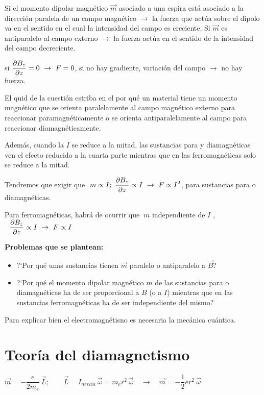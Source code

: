 Si el momento dipolar magnético $\vec m$ asociado a una espira está asociado a la dirección paralela de un campo magnético $\to$ la fuerza que actúa sobre el dipolo va en el sentido en el cual la intensidad del campo es creciente. Si $\vec m$ es antiparalelo al campo externo $\to$ la fuerza actúa en el sentido de la intensidad del campo decreciente.

si $\displaystyle \pdv{B_z}{z}=0 \ \to \ F=0$, si no hay gradiente, variación del campo $\to$ no hay fuerza.

\begin{miparrafodestacado}
	El quid de la cuestión estriba en el por qué un material tiene un momento magnético que se orienta paralelamente al campo magnético externo para reaccionar paramagnéticamente o se orienta antiparalelamente al campo para reaccionar diamagnéticamente.
	
	Además, cuando la $I$ se reduce a la mitad, las sustancias para y diamagnéticas ven el efecto reducido a la cuarta parte mientras que en las ferromagnéticas solo se reduce a la mitad.
\end{miparrafodestacado}

Tendremos que exigir que $\ m \propto I;\ \displaystyle \pdv{B_z}{z} \propto I \ \to \ F \propto I^2$, para sustancias para o diamagnéticas.

Para ferromagnéticas, habrá de ocurrir que $\ m $ independiente de $I$ , $\ \ \displaystyle \pdv{B_z}{z} \propto I \ \to \ F \propto I$

\textbf{Problemas que se plantean:}

\begin{itemize}
	\item ?`Por qué unas sustancias tienen $\vec m$  paralelo o antiparalelo a $\vec B$?
	\item ?`Por qué el momento dipolar magnético $m$ de las sustancias para o diamagnéticas ha de ser proporcional a $B$ (o a $I$) mientras que en las sustancias ferromagnéticas ha de ser independiente del mismo?
\end{itemize}

\textcolor{gris}{Para explicar bien el electromagnétisno es necesaria la mecánica cuántica.}

\section{Teoría del diamagnetismo}

$\vec m = -\dfrac{e}{2m_e} \ \vec L;\qquad \vec L= I_{nercia}\  \vec \omega = m_er^2 \ \vec \omega \quad \to \quad \vec m=-\dfrac 1 2 e r^2 \ \vec \omega$


